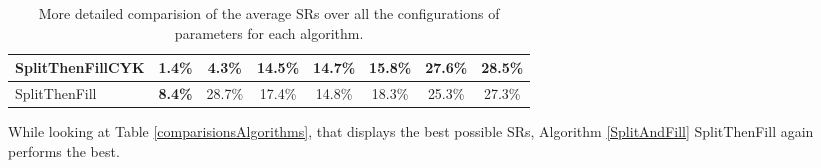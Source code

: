 \begin{table}[h]
\begin{adjustbox}{max width=\textwidth}
\begin{tabular}{|l|c|c|c|c|c|c|c|}
		SplitThenFillCYK                   &\textbf{1.4\%}    &4.3\%                                                           &14.5\%                                                              &14.7\%      &15.8\%                                                        &27.6\%                                                         &28.5\%                                                           \\ \hline
		SplitThenFill                    &\textbf{8.4\%}      &28.7\%                                                           &17.4\%                                                              &14.8\%      &18.3\%                                                        &25.3\%                                                         &27.3\%                                                           \\ \hline
	\end{tabular}
\end{adjustbox}
	\caption{More detailed comparision of the average SRs over all the configurations of parameters for each algorithm.}
	\label{comparisionsAlgorithmsMean}
\end{table}
\noindent While looking at Table \ref{comparisionsAlgorithms}, that displays the best possible SRs, Algorithm \ref{SplitAndFill} SplitThenFill again performs the best.\\
 
